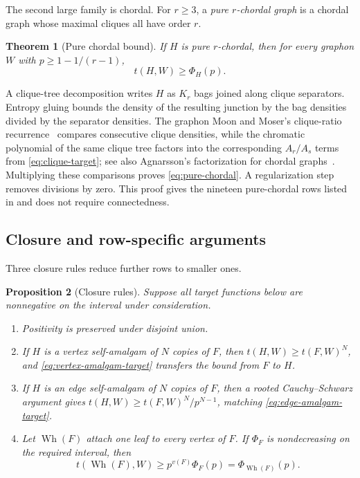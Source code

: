 \documentclass[11pt]{article}
\numberwithin{equation}{section}
\newtheorem{theorem}{Theorem}[section]
\newtheorem{proposition}[theorem]{Proposition}
\theoremstyle{definition}
\theoremstyle{remark}
\begin{document}
The second large family is chordal.  For $r\geq3$, a \emph{pure
$r$-chordal graph} is a chordal graph whose maximal cliques all have order
$r$.

\begin{theorem}[Pure chordal bound]
\label{thm:pure-chordal}
If $H$ is pure $r$-chordal, then for every graphon $W$ with
$p\geq1-1/(r-1)$,
\begin{equation}
 t(H,W)\geq\Phi_H(p).
 \label{eq:pure-chordal}
\end{equation}
\end{theorem}

A clique-tree decomposition writes $H$ as $K_r$ bags joined along clique
separators.  Entropy gluing bounds the density of the resulting junction by
the bag densities divided by the separator densities.  The graphon
Moon and Moser's clique-ratio recurrence~\cite{MoonMoser1962} compares
consecutive clique densities, while the
chromatic polynomial of the same clique tree factors into the corresponding
$A_r/A_s$ terms from \eqref{eq:clique-target}; see also Agnarsson's
factorization for chordal graphs~\cite{Agnarsson2003}.  Multiplying these comparisons
proves \eqref{eq:pure-chordal}.  A regularization step removes divisions by
zero.  This proof gives the nineteen pure-chordal rows listed in
 and does not require connectedness.

\subsection{Closure and row-specific arguments}

Three closure rules reduce further rows to smaller ones.

\begin{proposition}[Closure rules]
\label{prop:closures}
Suppose all target functions below are nonnegative on the interval under
consideration.
\begin{enumerate}[label=(\roman*)]
\item Positivity is preserved under disjoint union.
\item If $H$ is a vertex self-amalgam of $N$ copies of $F$, then
$t(H,W)\geq t(F,W)^N$, and \eqref{eq:vertex-amalgam-target} transfers the
bound from $F$ to $H$.
\item If $H$ is an edge self-amalgam of $N$ copies of $F$, then a rooted
Cauchy--Schwarz argument gives
$t(H,W)\geq t(F,W)^N/p^{N-1}$, matching
\eqref{eq:edge-amalgam-target}.
\item Let $\operatorname{Wh}(F)$ attach one leaf to every vertex of $F$.
If $\Phi_F$ is nondecreasing on the required interval, then
\[
 t(\operatorname{Wh}(F),W)\geq p^{v(F)}\Phi_F(p)
 =\Phi_{\operatorname{Wh}(F)}(p).
\]
\end{enumerate}
\end{proposition}
\end{document}
